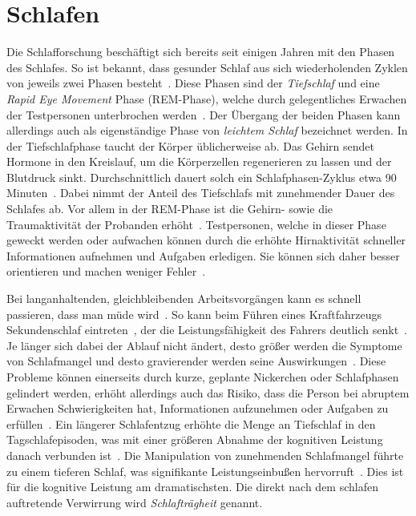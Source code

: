 \section{Schlafen}\label{sec:relatedWork.schlafen}

Die Schlafforschung beschäftigt sich bereits seit einigen Jahren mit den Phasen des Schlafes. So ist bekannt, dass gesunder Schlaf aus sich wiederholenden Zyklen von jeweils zwei Phasen besteht~\cite{broughton1968sleep}.
Diese Phasen sind der \textit{Tiefschlaf} und eine \textit{Rapid Eye Movement} Phase (REM-Phase), welche durch gelegentliches Erwachen der Testpersonen unterbrochen werden~\cite{broughton1968sleep}. Der Übergang der beiden Phasen kann allerdings auch als eigenständige Phase von \textit{leichtem Schlaf} bezeichnet werden. 
In der Tiefschlafphase taucht der Körper üblicherweise ab. Das Gehirn sendet Hormone in den Kreislauf, um die Körperzellen regenerieren zu lassen und der Blutdruck sinkt.
Durchschnittlich dauert solch ein Schlafphasen-Zyklus etwa 90 Minuten~\cite{broughton1968sleep}. Dabei nimmt der Anteil des Tiefschlafs mit zunehmender Dauer des Schlafes ab.
Vor allem in der REM-Phase ist die Gehirn- sowie die Traumaktivität der Probanden erhöht~\cite{gackenbach1991herrscher, broughton1968sleep}. Testpersonen, welche in dieser Phase geweckt werden oder aufwachen können durch die erhöhte Hirnaktivität schneller Informationen aufnehmen und Aufgaben erledigen. Sie können sich daher besser orientieren und machen weniger Fehler~\cite{aschoff1985perception}. 


Bei langanhaltenden, gleichbleibenden Arbeitsvorgängen kann es schnell passieren, dass man müde wird~\cite{dinges1985assessing,kraemer2000time}. So kann beim Führen eines Kraftfahrzeugs Sekundenschlaf eintreten~\cite{ruhle2008sekundenschlaf, muttray2010videoanalyse,mccartt2000factors}, der die Leistungsfähigkeit des Fahrers deutlich senkt~\cite{boyle2008driver}. Je länger sich dabei der Ablauf nicht ändert, desto größer werden die Symptome von Schlafmangel und desto gravierender werden seine Auswirkungen~\cite{boyle2008driver,mccartt2000factors}.
Diese Probleme können einerseits durch kurze, geplante Nickerchen oder Schlafphasen gelindert werden, erhöht allerdings auch das Risiko, dass die Person bei abruptem Erwachen Schwierigkeiten hat, Informationen aufzunehmen oder Aufgaben zu erfüllen~\cite{dinges1985assessing}. 
Ein längerer Schlafentzug erhöhte die Menge an Tiefschlaf in den Tagschlafepisoden, was mit einer größeren Abnahme der kognitiven Leistung danach verbunden ist~\cite{dinges1985assessing}. Die Manipulation von zunehmenden Schlafmangel führte zu einem tieferen Schlaf, was signifikante Leistungseinbußen hervorruft~\cite{dinges1985assessing}. Dies ist für die kognitive Leistung am dramatischsten. Die direkt nach dem schlafen auftretende Verwirrung wird \textit{Schlafträgheit} genannt.

